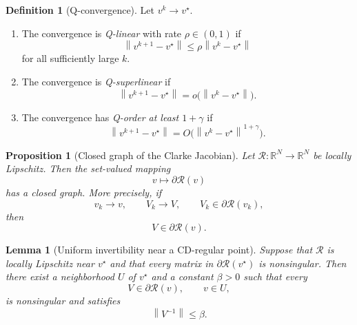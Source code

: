\documentclass[a4paper,11pt]{book}
\theoremstyle{plain}
\newtheorem{proposition}[theorem]{Proposition}
\newtheorem{lemma}[theorem]{Lemma}
\theoremstyle{definition}
\newtheorem{definition}[theorem]{Definition}
\theoremstyle{remark}
\numberwithin{equation}{chapter}
\numberwithin{algorithm}{chapter}
\newcommand{\R}{\mathbb{R}}
\newcommand{\norm}[1]{\left\|#1\right\|}
\begin{document}
	\begin{definition}[Q-convergence]
		Let \(v^k\to v^\star\).
		
		\begin{enumerate}
			\item The convergence is \emph{Q-linear} with rate
			\(\rho\in(0,1)\) if
			\[
			\norm{v^{k+1}-v^\star}
			\leq
			\rho\norm{v^k-v^\star}
			\]
			for all sufficiently large \(k\).
			
			\item The convergence is \emph{Q-superlinear} if
			\[
			\norm{v^{k+1}-v^\star}
			=
			o\bigl(\norm{v^k-v^\star}\bigr).
			\]
			
			\item The convergence has \emph{Q-order at least \(1+\gamma\)} if
			\[
			\norm{v^{k+1}-v^\star}
			=
			O\bigl(\norm{v^k-v^\star}^{1+\gamma}\bigr).
			\]
		\end{enumerate}
	\end{definition}
	
	\begin{proposition}[Closed graph of the Clarke Jacobian]
		Let \(\mathcal R:\R^N\to\R^N\) be locally Lipschitz. Then the set-valued
		mapping
		\[
		v\longmapsto\partial\mathcal R(v)
		\]
		has a closed graph. More precisely, if
		\[
		v_k\to v,
		\qquad
		V_k\to V,
		\qquad
		V_k\in\partial\mathcal R(v_k),
		\]
		then
		\[
		V\in\partial\mathcal R(v).
		\]
	\end{proposition}
	
	
	\begin{lemma}[Uniform invertibility near a CD-regular point]
		Suppose that \(\mathcal R\) is locally Lipschitz near \(v^\star\) and that
		every matrix in \(\partial\mathcal R(v^\star)\) is nonsingular. Then there
		exist a neighborhood \(U\) of \(v^\star\) and a constant \(\beta>0\) such
		that every
		\[
		V\in\partial\mathcal R(v),
		\qquad v\in U,
		\]
		is nonsingular and satisfies
		\[
		\norm{V^{-1}}\leq\beta.
		\]
	\end{lemma}
	
\end{document}
